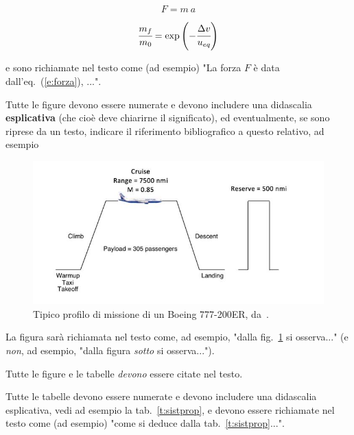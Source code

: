 \documentclass{baer}
\begin{document}
\begin{equation}
F = m \: a
\label{e:forza}
\end{equation}

\begin{equation}
\cfrac{m_f}{m_0}=\exp\left(-\cfrac{\Delta v}{u_{eq}}\right)
\label{e:massratio}
\end{equation}

\noindent e sono richiamate nel testo come (ad esempio) "La forza $F$ è data dall'eq.~(\ref{e:forza}), ...".

\smallskip 


\noindent Tutte le figure devono essere numerate e devono includere una didascalia \textbf{esplicativa} (che cioè deve chiarirne il significato), ed eventualmente, se sono riprese da un testo, indicare il riferimento bibliografico a questo relativo, ad esempio

\begin{figure}[h]
\centerline{\includegraphics[width=0.9\columnwidth]{B777.jpg}}
\caption{Tipico profilo di missione di un Boeing 777-200ER, da~.}
\label{f:B777}
\end{figure} 

La figura sarà richiamata nel testo come, ad esempio, "dalla fig.~\ref{f:B777} si osserva..."  (e \textit{non}, ad esempio, "dalla figura \textit{sotto} si osserva...").

\smallskip 

\noindent Tutte le figure e le tabelle \textit{devono} essere citate nel testo.

\smallskip 

\noindent Tutte le tabelle devono essere numerate e devono includere una didascalia esplicativa, vedi ad esempio la tab.~\ref{t:sistprop}, e devono essere richiamate nel testo come (ad esempio) "come si deduce dalla tab.~\ref{t:sistprop}...".
\end{document}
